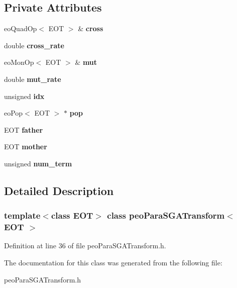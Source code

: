 \subsection*{Private Attributes}
\begin{CompactItemize}
\item 
eo\-Quad\-Op$<$ EOT $>$ \& {\bf cross}\label{classpeo_para_s_g_a_transform_c6f97deabe7502c84f5b6c479013f6dc}

\item 
double {\bf cross\_\-rate}\label{classpeo_para_s_g_a_transform_dfcf216e2df05016db4d57a5ffb0b0e2}

\item 
eo\-Mon\-Op$<$ EOT $>$ \& {\bf mut}\label{classpeo_para_s_g_a_transform_34ff5f9d285ca4879cf8865fb425a311}

\item 
double {\bf mut\_\-rate}\label{classpeo_para_s_g_a_transform_b9d3a2094737d0bbd034aac942cc53e3}

\item 
unsigned {\bf idx}\label{classpeo_para_s_g_a_transform_03972feadc86626e58fe60bd4061b57e}

\item 
eo\-Pop$<$ EOT $>$ $\ast$ {\bf pop}\label{classpeo_para_s_g_a_transform_94e10a1285e128aba6e71517c941f961}

\item 
EOT {\bf father}\label{classpeo_para_s_g_a_transform_9ef60190e2e3bd5961a93d1b52cb275d}

\item 
EOT {\bf mother}\label{classpeo_para_s_g_a_transform_e991ad2af6d116afd855de2db46e1d27}

\item 
unsigned {\bf num\_\-term}\label{classpeo_para_s_g_a_transform_589ea7cd72d522ae51a07de4d8ffbf11}

\end{CompactItemize}


\subsection{Detailed Description}
\subsubsection*{template$<$class EOT$>$ class peo\-Para\-SGATransform$<$ EOT $>$}





Definition at line 36 of file peo\-Para\-SGATransform.h.

The documentation for this class was generated from the following file:\begin{CompactItemize}
\item 
peo\-Para\-SGATransform.h\end{CompactItemize}
